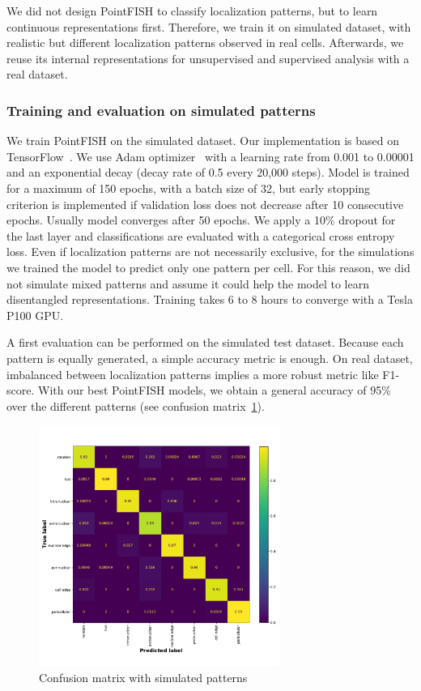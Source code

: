 We did not design PointFISH to classify localization patterns, but to learn continuous representations first.
Therefore, we train it on simulated dataset, with realistic but different localization patterns observed in real cells.
Afterwards, we reuse its internal representations for unsupervised and supervised analysis with a real dataset.

\subsubsection{Training and evaluation on simulated patterns}

We train PointFISH on the simulated dataset.
Our implementation is based on TensorFlow~\cite{tensorflow_2015}.
We use Adam optimizer~\cite{Diederik_2015} with a learning rate from 0.001 to 0.00001 and an exponential decay (decay rate of 0.5 every 20,000 steps).
Model is trained for a maximum of 150 epochs, with a batch size of 32, but early stopping criterion is implemented if validation loss does not decrease after 10 consecutive epochs.
Usually model converges after 50 epochs.
We apply a 10\% dropout for the last layer and classifications are evaluated with a categorical cross entropy loss.
Even if localization patterns are not necessarily exclusive, for the simulations we trained the model to predict only one pattern per cell.
For this reason, we did not simulate mixed patterns and assume it could help the model to learn disentangled representations.
Training takes 6 to 8 hours to converge with a Tesla P100 GPU.

A first evaluation can be performed on the simulated test dataset.
Because each pattern is equally generated, a simple accuracy metric is enough.
On real dataset, imbalanced between localization patterns implies a more robust metric like F1-score.
With our best PointFISH models, we obtain a general accuracy of 95\% over the different patterns (see confusion matrix~\ref{fig:confusion_matrix}).

\begin{figure}[h]
    \centering
    \includegraphics[width=0.7\textwidth]{figures/chapter4/confusion_matrix}
    \caption{Confusion matrix with simulated patterns}
    \label{fig:confusion_matrix}
\end{figure}

